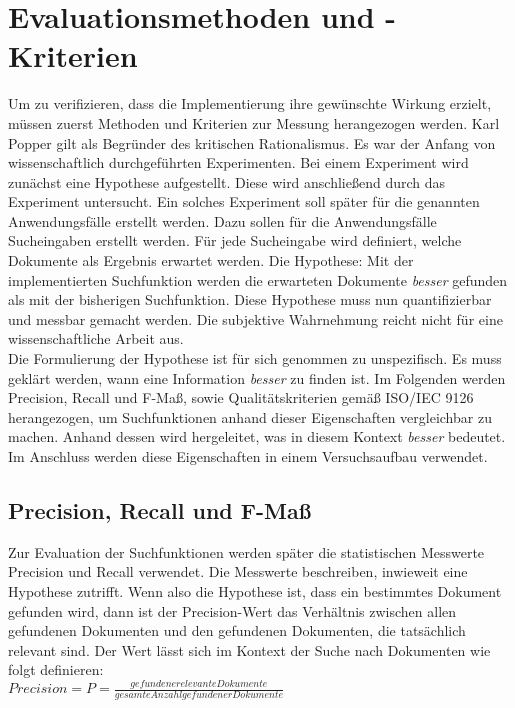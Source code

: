 \chapter{Evaluationsmethoden und -Kriterien}
Um zu verifizieren, dass die Implementierung ihre gewünschte Wirkung erzielt, müssen zuerst Methoden und Kriterien zur Messung herangezogen werden.
Karl Popper gilt als Begründer des kritischen Rationalismus.
Es war der Anfang von wissenschaftlich durchgeführten Experimenten.
Bei einem Experiment wird zunächst eine Hypothese aufgestellt.
Diese wird anschließend durch das Experiment untersucht.
Ein solches Experiment soll später für die genannten Anwendungsfälle erstellt werden.
Dazu sollen für die Anwendungsfälle Sucheingaben erstellt werden.
Für jede Sucheingabe wird definiert, welche Dokumente als Ergebnis erwartet werden.
Die Hypothese: Mit der implementierten Suchfunktion werden die erwarteten Dokumente \textit{besser} gefunden als mit der bisherigen Suchfunktion.
Diese Hypothese muss nun quantifizierbar und messbar gemacht werden.
Die subjektive Wahrnehmung reicht nicht für eine wissenschaftliche Arbeit aus.\\

Die Formulierung der Hypothese ist für sich genommen zu unspezifisch.
Es muss geklärt werden, wann eine Information \textit{besser} zu finden ist.
Im Folgenden werden Precision, Recall und F-Maß, sowie Qualitätskriterien gemäß ISO/IEC 9126 herangezogen, um Suchfunktionen anhand dieser Eigenschaften vergleichbar zu machen.
Anhand dessen wird hergeleitet, was in diesem Kontext \textit{besser} bedeutet.
Im Anschluss werden diese Eigenschaften in einem Versuchsaufbau verwendet. 

\section{Precision, Recall und F-Maß}
Zur Evaluation der Suchfunktionen werden später die statistischen Messwerte Precision und Recall verwendet.
Die Messwerte beschreiben, inwieweit eine Hypothese zutrifft.
Wenn also die Hypothese ist, dass ein bestimmtes Dokument gefunden wird, dann ist der Precision-Wert das Verhältnis zwischen allen gefundenen Dokumenten und den gefundenen Dokumenten, die tatsächlich relevant sind.
Der Wert lässt sich im Kontext der Suche nach Dokumenten wie folgt definieren\cite{Sirotkin_2012}:\\

\(Precision=P=\frac{gefundene relevante Dokumente}{gesamte Anzahl gefundener Dokumente} \)\\

